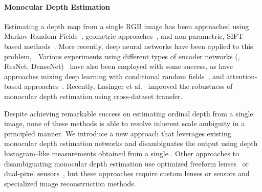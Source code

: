 

\paragraph{Monocular Depth Estimation}
%
Estimating a depth map from a single RGB image has been approached using Markov
Random Fields~\cite{Saxena2006}, geometric approaches~\cite{Hoiem2005}, and
non-parametric, SIFT-based methods~\cite{Karsch2014}. More recently, deep neural
networks have been applied to this problem, . Various
experiments using different types of encoder networks (\eg, ResNet,
DenseNet)~\cite{Alhashim2018,Laina2016} have also been employed with some
success, as have approaches mixing deep learning with conditional random
fields~\cite{Xu2017}, and attention-based approaches~\cite{Hao2018,Xu2018}.
Recently, Lasinger et al.~\cite{Lasinger:2019} improved the robustness of
monocular depth estimation using cross-dataset transfer.

Despite achieving remarkable success on estimating ordinal depth from a single
image, none of these methods is able to resolve inherent scale ambiguity in a
principled manner. We introduce a new approach that leverages existing monocular
depth estimation networks and disambiguates the output using depth
histogram--like measurements obtained from a single . Other
approaches to disambiguating monocular depth estimation use optimized freeform
lenses~\cite{Chang:2019:DeepOptics3D,Wu:2019} or dual-pixel
sensors~\cite{Garg:2019}, but these approaches require custom lenses or sensors
and specialized image reconstruction methods.  

